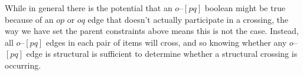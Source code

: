 While in general there is the potential that an $o$--$[pq]$ boolean might be true because of an $op$ or $oq$ edge that doesn't actually participate in a crossing, the way we have set the parent constraints above means this is not the case.
Instead, all $o$--$[pq]$ edges in each pair of items will cross, and so knowing whether any $o$--$[pq]$ edge is structural is sufficient to determine whether a structural crossing is occurring.
